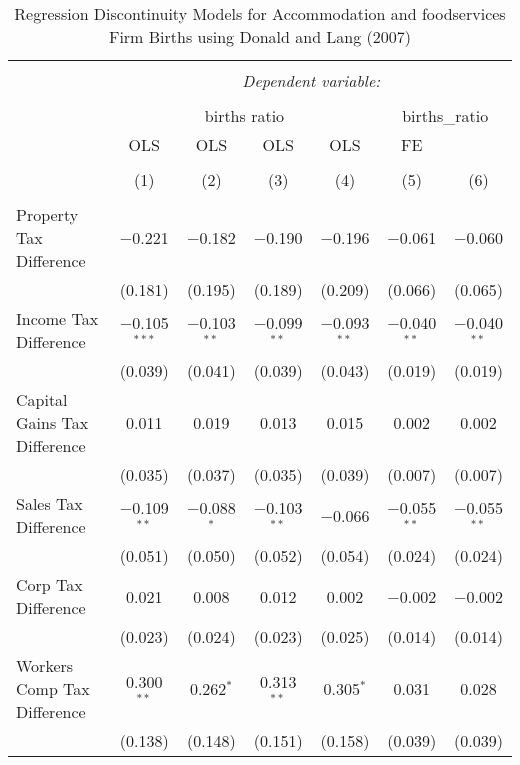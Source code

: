 
\begin{table}[!htbp] \centering 
  \caption{Regression Discontinuity Models for  Accommodation and foodservices Firm Births using Donald and Lang (2007)} 
  \label{} 
\begin{tabular}{@{\extracolsep{5pt}}lcccccc} 
\\[-1.8ex]\hline 
\hline \\[-1.8ex] 
 & \multicolumn{6}{c}{\textit{Dependent variable:}} \\ 
\cline{2-7} 
\\[-1.8ex] & \multicolumn{4}{c}{births ratio} & \multicolumn{2}{c}{births\_ratio} \\ 
 & OLS & OLS & OLS & OLS & FE &  \\ 
\\[-1.8ex] & (1) & (2) & (3) & (4) & (5) & (6)\\ 
\hline \\[-1.8ex] 
 Property Tax Difference & $-$0.221 & $-$0.182 & $-$0.190 & $-$0.196 & $-$0.061 & $-$0.060 \\ 
  & (0.181) & (0.195) & (0.189) & (0.209) & (0.066) & (0.065) \\ 
  Income Tax Difference & $-$0.105$^{***}$ & $-$0.103$^{**}$ & $-$0.099$^{**}$ & $-$0.093$^{**}$ & $-$0.040$^{**}$ & $-$0.040$^{**}$ \\ 
  & (0.039) & (0.041) & (0.039) & (0.043) & (0.019) & (0.019) \\ 
  Capital Gains Tax Difference & 0.011 & 0.019 & 0.013 & 0.015 & 0.002 & 0.002 \\ 
  & (0.035) & (0.037) & (0.035) & (0.039) & (0.007) & (0.007) \\ 
  Sales Tax Difference & $-$0.109$^{**}$ & $-$0.088$^{*}$ & $-$0.103$^{**}$ & $-$0.066 & $-$0.055$^{**}$ & $-$0.055$^{**}$ \\ 
  & (0.051) & (0.050) & (0.052) & (0.054) & (0.024) & (0.024) \\ 
  Corp Tax Difference & 0.021 & 0.008 & 0.012 & 0.002 & $-$0.002 & $-$0.002 \\ 
  & (0.023) & (0.024) & (0.023) & (0.025) & (0.014) & (0.014) \\ 
  Workers Comp Tax Difference & 0.300$^{**}$ & 0.262$^{*}$ & 0.313$^{**}$ & 0.305$^{*}$ & 0.031 & 0.028 \\ 
  & (0.138) & (0.148) & (0.151) & (0.158) & (0.039) & (0.039) \\ 

\end{tabular}
\end{table}
